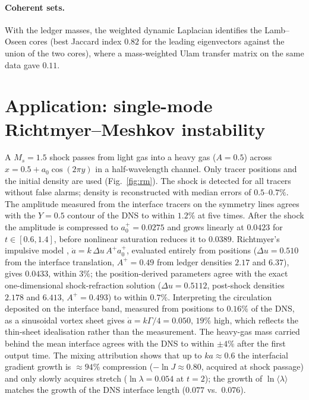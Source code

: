 \documentclass[11pt]{article}
\theoremstyle{definition}\newtheorem{definition}{Definition}\theoremstyle{remark}\newtheorem{remark}{Remark}
\begin{document}
\paragraph{Coherent sets.} With the ledger masses, the weighted dynamic Laplacian identifies the Lamb--Oseen cores (best Jaccard index $0.82$ for the leading eigenvectors against the union of the two cores), where a mass-weighted Ulam transfer matrix on the same data gave $0.11$.

\section{Application: single-mode Richtmyer--Meshkov instability}
A $M_s=1.5$ shock passes from light gas into a heavy gas ($A=0.5$) across $x=0.5+a_0\cos(2\pi y)$ in a half-wavelength channel. Only tracer positions and the initial density are used (Fig.~\ref{fig:rm}). The shock is detected for all tracers without false alarms; density is reconstructed with median errors of $0.5$--$0.7\%$. The amplitude measured from the interface tracers on the symmetry lines agrees with the $Y=0.5$ contour of the DNS to within $1.2\%$ at five times. After the shock the amplitude is compressed to $a_0^+=0.0275$ and grows linearly at $0.0423$ for $t\in[0.6,1.4]$, before nonlinear saturation reduces it to $0.0389$. Richtmyer's impulsive model \citep{Richtmyer1960}, $\dot a=k\,\Delta u\,A^+a_0^+$, evaluated entirely from positions ($\Delta u=0.510$ from the interface translation, $A^+=0.49$ from ledger densities $2.17$ and $6.37$), gives $0.0433$, within $3\%$; the position-derived parameters agree with the exact one-dimensional shock-refraction solution ($\Delta u=0.5112$, post-shock densities $2.178$ and $6.413$, $A^+=0.493$) to within $0.7\%$. Interpreting the circulation deposited on the interface band, measured from positions to $0.16\%$ of the DNS, as a sinusoidal vortex sheet gives $\dot a=k\Gamma/4=0.050$, $19\%$ high, which reflects the thin-sheet idealisation rather than the measurement. The heavy-gas mass carried behind the mean interface agrees with the DNS to within $\pm4\%$ after the first output time. The mixing attribution shows that up to $ka\approx0.6$ the interfacial gradient growth is $\approx94\%$ compression ($-\ln J\approx0.80$, acquired at shock passage) and only slowly acquires stretch ($\ln\lambda=0.054$ at $t=2$); the growth of $\ln\langle\lambda\rangle$ matches the growth of the DNS interface length ($0.077$ vs.\ $0.076$).
\end{document}
